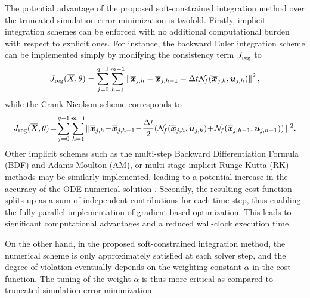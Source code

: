 \documentclass{article} %
\newtheorem{remark}{Remark}{\normalfont}{\normalfont}
\newcommand{\NN}{\mathcal{N}} %
\newcommand{\batchsize}{q}
\newcommand{\seqlen}{m}
\newcommand{\tens}[1]{\bm{#1}}
\newcommand{\hidden}[1]{\overline{#1}}
\newcommand{\norm}[1]{\left\lVert#1\right\rVert}
\begin{document}

The potential advantage of the proposed soft-constrained integration method over the truncated simulation error minimization is twofold.  Firstly, implicit integration schemes can be enforced with no additional computational burden with respect to explicit ones. For instance, the backward Euler integration scheme can be implemented simply by modifying the consistency term $J_{\rm reg}$ to  \begin{equation}
\label{eq:soft_backward_euler}
J_{\rm reg}(\hidden{X}, \theta) =  \sum_{j=0}^{\batchsize-1}\sum_{h=1}^{\seqlen-1} \norm{\hidden{\tens{x}}_{j,h} - 
\hidden{\tens{x}}_{j,h-1} - \Delta t \NN_{\!f}(\hidden{\tens{x}}_{j,h}, \tens{u}_{j,h})}^2,
\end{equation}
while the Crank-Nicolson scheme corresponds to
\begin{equation}
\label{eq:soft_crank-nicolson}
J_{\rm reg}(\hidden{X}, \theta)\! =\!  \sum_{j=0}^{\batchsize-1}\sum_{h=1}^{\seqlen-1} \! ||\hidden{\tens{x}}_{j,h}\! -\! 
\hidden{\tens{x}}_{j,h-1}\! -\! \frac{\Delta t}{2} \! \left( \NN_{\!f}(\hidden{\tens{x}}_{j,h}, \tens{u}_{j,h})\!+\!\NN_{\!f}(\hidden{\tens{x}}_{j,h-1}, \tens{u}_{j,h-1}) \right)||^2.
\end{equation}
Other implicit schemes such as the multi-step Backward Differentiation Formula (BDF) and Adams-Moulton (AM), or multi-stage implicit Runge Kutta (RK) methods may be similarly implemented, leading to a potential increase in the accuracy of the ODE numerical solution \cite{quarteroni2010numerical}. 
Secondly, the resulting cost function splits up as a sum of independent contributions for each time step, thus enabling the fully parallel implementation of gradient-based optimization. This leads to significant computational advantages and a reduced wall-clock execution time. 

On the other hand, in the proposed soft-constrained integration method, the numerical scheme is only approximately satisfied at each solver step, and the degree of violation eventually depends on the weighting constant $\alpha$ in the cost function. The tuning of the weight $\alpha$ is thus more critical  as compared to truncated simulation error minimization.

\end{document}

